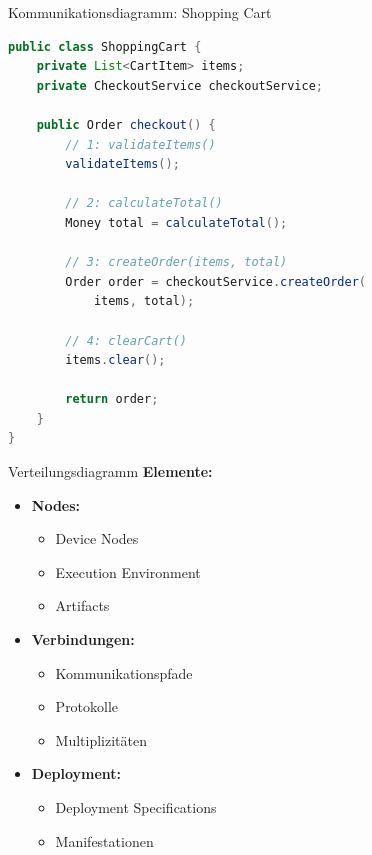 \begin{example2}{Kommunikationsdiagramm: Shopping Cart}
\begin{lstlisting}[language=Java, style=basesmol]
public class ShoppingCart {
    private List<CartItem> items;
    private CheckoutService checkoutService;
    
    public Order checkout() {
        // 1: validateItems()
        validateItems();
        
        // 2: calculateTotal()
        Money total = calculateTotal();
        
        // 3: createOrder(items, total)
        Order order = checkoutService.createOrder(
            items, total);
            
        // 4: clearCart()
        items.clear();
        
        return order;
    }
}
\end{lstlisting}
\end{example2}

\columnbreak

\begin{definition}{Verteilungsdiagramm}
\textbf{Elemente:}
\begin{itemize}
    \item \textbf{Nodes:}
    \begin{itemize}
        \item Device Nodes
        \item Execution Environment
        \item Artifacts
    \end{itemize}
    
    \item \textbf{Verbindungen:}
    \begin{itemize}
        \item Kommunikationspfade
        \item Protokolle
        \item Multiplizitäten
    \end{itemize}
    
    \item \textbf{Deployment:}
    \begin{itemize}
        \item Deployment Specifications
        \item Manifestationen
    \end{itemize}
\end{itemize}
\end{definition}

